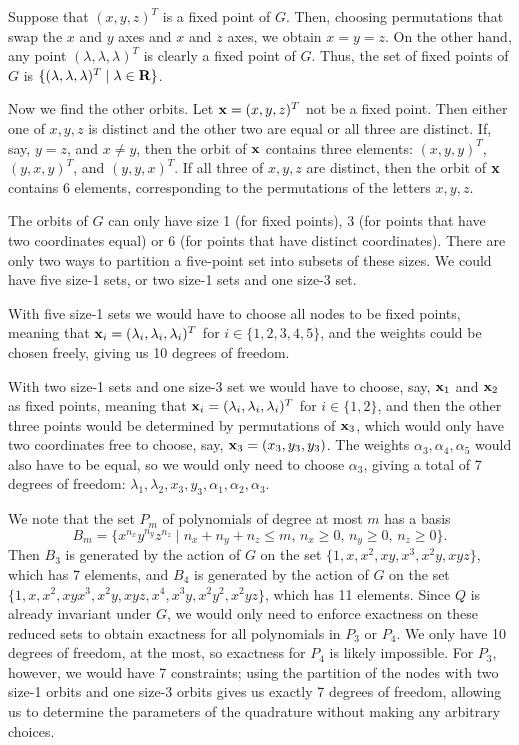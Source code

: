 \documentclass{homework}
\begin{document}
\begin{alphaparts}
		Suppose that $(x,y,z)^T$ is a fixed point of $G$. Then, choosing permutations that swap the $x$ and $y$ axes and $x$ and $z$ axes, we obtain $x=y=z$. On the other hand, any point $(\lambda, \lambda, \lambda)^T$ is clearly a fixed point of $G$. Thus, the set of fixed points of $G$ is $\{(\lambda, \lambda, \lambda)^T \mid \lambda \in \textbf{R}\}$. 
		
		Now we find the other orbits. Let $\mathbf{x} = (x,y,z)^T$ not be a fixed point. Then either one of $x,y,z$ is distinct and the other two are equal or all three are distinct. If, say, $y=z$, and $x\ne y$, then the orbit of $\mathbf{x}$ contains three elements: $(x,y,y)^T$, $(y,x,y)^T$, and $(y,y,x)^T$. If all three of $x,y,z$ are distinct, then the orbit of $\mathbf{x}$ contains 6 elements, corresponding to the permutations of the letters $x,y,z$. 
		
		The orbits of $G$ can only have size 1 (for fixed points), 3 (for points that have two coordinates equal) or 6 (for points that have distinct coordinates). There are only two ways to partition a five-point set into subsets of these sizes. We could have five size-1 sets, or two size-1 sets and one size-3 set.
		
		With five size-1 sets we would have to choose all nodes to be fixed points, meaning that $\mathbf{x}_i = (\lambda_i, \lambda_i, \lambda_i)^T$ for $i \in \{1,2,3,4,5\}$, and the weights could be chosen freely, giving us 10 degrees of freedom.
		
		With two size-1 sets and one size-3 set we would have to choose, say, $\mathbf{x}_1$ and $\mathbf{x}_2$ as fixed points, meaning that $\mathbf{x}_i = (\lambda_i,\lambda_i,\lambda_i)^T$ for $i\in \{1,2\}$, and then the other three points would be determined by permutations of $\mathbf{x}_3$, which would only have two coordinates free to choose, say, $\mathbf{x}_3 = (x_3, y_3, y_3)$. The weights $\alpha_3,\alpha_4,\alpha_5$ would also have to be equal, so we would only need to choose $\alpha_3$, giving a total of 7 degrees of freedom: $\lambda_1,\lambda_2, x_3, y_3, \alpha_1,\alpha_2,\alpha_3$.
		
		We note that the set $P_m$ of polynomials of degree at most $m$ has a basis
		\begin{equation*}
			B_m = \{x^{n_x}y^{n_y}z^{n_z} \mid n_x + n_y + n_z \le m,\, n_x \ge 0,\, n_y\ge 0,\,n_z\ge 0\}.
		\end{equation*}
		Then $B_3$ is generated by the action of $G$ on the set $\{1,x,x^2,xy, x^3, x^2y, xyz\}$, which has 7 elements, and $B_4$ is generated by the action of $G$ on the set $\{1,x,x^2,xy x^3,x^2y,xyz,x^4,x^3y,x^2y^2,x^2yz\}$, which has 11 elements. Since $Q$ is already invariant under $G$, we would only need to enforce exactness on these reduced sets to obtain exactness for all polynomials in $P_3$ or $P_4$. We only have 10 degrees of freedom, at the most, so exactness for $P_4$ is likely impossible. For $P_3$, however, we would have 7 constraints; using the partition of the nodes with two size-1 orbits and one size-3 orbits gives us exactly 7 degrees of freedom, allowing us to determine the parameters of the quadrature without making any arbitrary choices.
		

\end{alphaparts}
\end{document}
